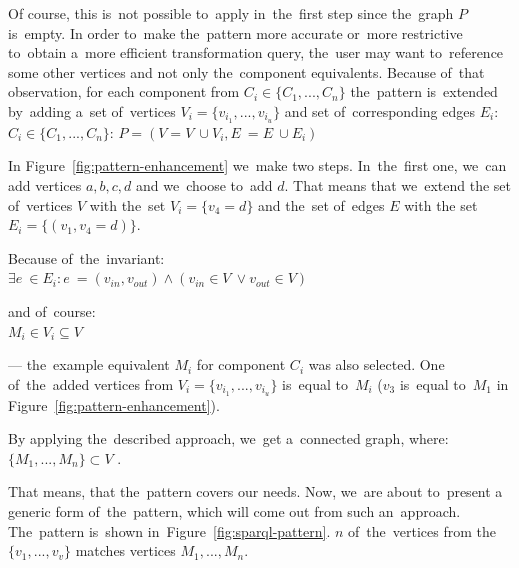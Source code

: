 Of course, this is~not possible to~apply in~the~first step since the~graph $P$ is~empty. 
In order to~make the~pattern more accurate or~more restrictive to~obtain a~more 
efficient transformation query, the~user may want to~reference some other 
vertices and not only the~component equivalents.
Because of~that observation, for each component from $C_i \in \{C_1 ,..., C_n\}$ the~pattern is~extended by~adding a~set of~vertices $V_i = \{v_{i_1}, ..., v_{i_u}\}$ and set of~corresponding edges 
$E_i$:\\

{\centering \forall $C_i \in \{C_1 ,..., C_n\}$: $P = (V = V~\cup V_i, E~= E~\cup E_i)$ \\[0.5cm]}

In Figure~\ref{fig:pattern-enhancement} we~make two steps. In~the~first one, we~can add vertices $a,b,c,d$ and we~choose to~add $d$. That means that we~extend 
the set of~vertices $V$ with the~set $V_i = \{v_4 = d\}$ and the~set of~edges $E$ with 
the set $E_i = \{(v_1,v_4 = d)\}$.

Because of~the~invariant:\\

{\centering $\exists e~\in E_i: e~= (v_{in}, v_{out}) \land (v_{in} \in V~\lor v_{out} \in V)$\\[0.5cm]}

and of~course:\\

{\centering $M_i \in V_i \subseteq V$ \\[0.5cm]}

--- the~example equivalent $M_i$ for component $C_i$ was also selected. One of~the~added vertices from $V_i = \{v_{i_1}, ..., v_{i_u}\}$ is~equal to~$M_i$ ($v_3$ is~equal to~$M_1$
in Figure~\ref{fig:pattern-enhancement}).
   
By applying the~described approach, we~get a~connected graph, where:\\

{\centering $\{M_1, ..., M_n\} \subset V$ .\\[0.5cm]}

That means, that the~pattern covers our needs. Now, we~are about to~present
a generic form of~the~pattern, which will come out from 
such an~approach. The~pattern is~shown in~Figure~\ref{fig:sparql-pattern}. 
$n$ of~the~vertices from the~$\{v_1, ..., v_v\}$ matches vertices $M_1, ..., M_n$.

